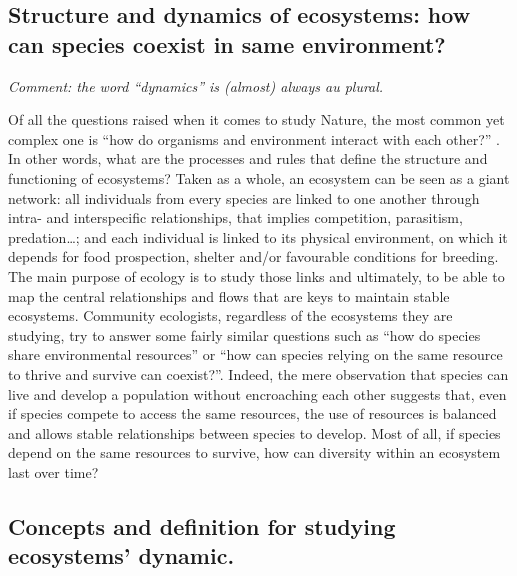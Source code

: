 

\subsection{Structure and dynamics of ecosystems: how can species coexist in same environment?} 

\emph{Comment: the word ``dynamics'' is (almost) always au plural.}

Of all the questions raised when it comes to study Nature, the most common yet complex one is ``how do organisms and environment interact with each other?'' \citep{sutherland2013}. In other words, what are the processes and rules that define the structure and functioning of ecosystems? Taken as a whole, an ecosystem can be seen as a giant network: all individuals from every species are linked to one another through intra- and interspecific relationships, that implies competition, parasitism, predation\ldots{}; and each individual is linked to its physical environment, on which it depends for food prospection, shelter and/or favourable conditions for breeding. The main purpose of ecology is to study those links and ultimately, to be able to map the central relationships and flows that are keys to maintain stable ecosystems. Community ecologists, regardless of the ecosystems they are studying, try to answer some fairly similar questions such as ``how do species share environmental resources'' or ``how can species relying on the same resource to thrive and survive can coexist?''. Indeed, the mere observation that species can live and develop a population without encroaching each other suggests that, even if species compete to access the same resources, the use of resources is balanced and allows stable relationships between species to develop. Most of all, if species depend on the same resources to survive, how can diversity within an ecosystem last over time?

\subsection{Concepts and definition for studying ecosystems’ dynamic.}
 

